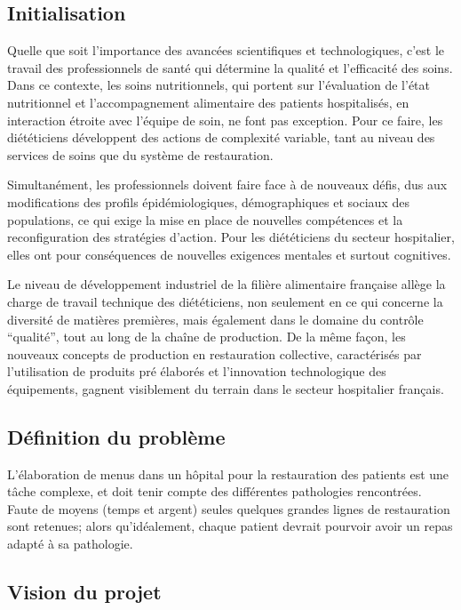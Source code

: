 \textcolor[RGB]{46, 116, 181}{\chapter{Initialisation}}
Quelle que soit l’importance des avancées scientifiques et technologiques, c’est le travail des
professionnels de santé qui détermine la qualité et l’efficacité des soins. Dans ce contexte, les soins
nutritionnels, qui portent sur l’évaluation de l’état nutritionnel et l’accompagnement alimentaire des
patients hospitalisés, en interaction étroite avec l’équipe de soin, ne font pas exception. Pour ce
faire, les diététiciens développent des actions de complexité variable, tant au niveau des services de
soins que du système de restauration.

Simultanément, les professionnels doivent faire face à de nouveaux défis, dus aux modifications des
profils épidémiologiques, démographiques et sociaux des populations, ce qui exige la mise en place
de nouvelles compétences et la reconfiguration des stratégies d’action. Pour les diététiciens du
secteur hospitalier, elles ont pour conséquences de nouvelles exigences mentales et surtout
cognitives.

Le niveau de développement industriel de la filière alimentaire française allège la charge de travail
technique des diététiciens, non seulement en ce qui concerne la diversité de matières premières,
mais également dans le domaine du contrôle \enquote{qualité}, tout au long de la chaîne de production. De
la même façon, les nouveaux concepts de production en restauration collective, caractérisés par
l’utilisation de produits pré élaborés et l’innovation technologique des équipements, gagnent
visiblement du terrain dans le secteur hospitalier français.

\section{Définition du problème}
L'élaboration de menus dans un hôpital pour la restauration des patients
est une tâche complexe, et doit tenir compte des différentes pathologies
rencontrées. Faute de moyens (temps et argent) seules quelques grandes
lignes de restauration sont retenues; alors qu'idéalement, chaque
patient devrait pourvoir avoir un repas adapté à sa pathologie.

\section{Vision du projet}
